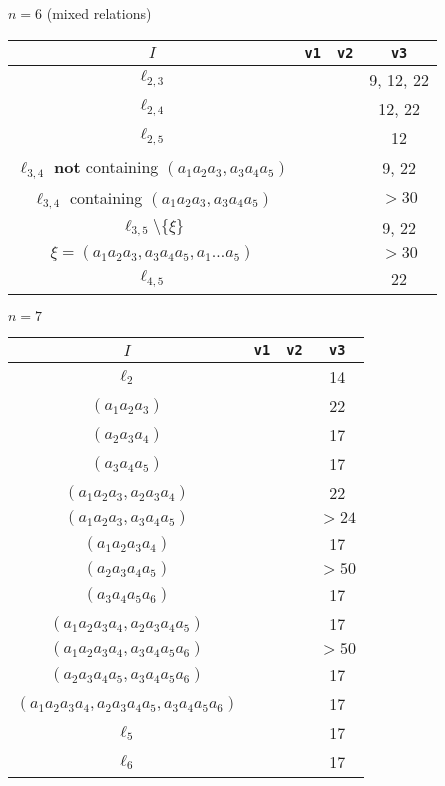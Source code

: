 \documentclass{article}
\begin{document}
\begin{flushleft}
\begin{center}
      \newpage

      $n=6$ (mixed relations)
      \begin{longtable}{|c|c|c|c|}
         \hline
         $I$ & \texttt{v1} & \texttt{v2} & \texttt{v3} \\
         \hline 
         $\ell_{2,3}$ &&& 9, 12, 22 \\
         $\ell_{2,4}$ &&& 12, 22 \\
         $\ell_{2,5}$ &&& 12 \\
         $\ell_{3,4}$ \textbf{not} containing $(a_1a_2a_3,a_3a_4a_5)$ &&& 9, 22 \\
         \hline
         \rowcolor{red!50!white}
         $\ell_{3,4}$ containing $(a_1a_2a_3,a_3a_4a_5)$ &&& $>30$ \\
         \hline
         $\ell_{3,5} \setminus \{\xi\}$ &&& 9, 22 \\
         \hline
         \rowcolor{red!50!white}
         $\xi = (a_1a_2a_3,a_3a_4a_5, a_1\ldots a_5)$ &&& $>30$ \\
         \hline
         $\ell_{4,5}$ &&& 22 \\
         \hline
      \end{longtable}

      $n=7$
      \begin{longtable}{|c|c|c|c|}
         \hline
         $I$ & \texttt{v1} & \texttt{v2} & \texttt{v3} \\
         \hline
         $\ell_2$ &&& 14 \\
         \hline
         $(a_1a_2a_3)$ &&& 22 \\
         $(a_2a_3a_4)$ &&& 17 \\
         $(a_3a_4a_5)$ &&& 17 \\
         $(a_1a_2a_3, a_2a_3a_4)$ &&& 22 \\
         \rowcolor{red!50!white}
         $(a_1a_2a_3,a_3a_4a_5)$ &&& $>24$ \\
         \hline
         $(a_1a_2a_3a_4)$ &&& 17 \\
         \rowcolor{red!50!white}
         $(a_2a_3a_4a_5)$ &&& $>50$ \\
         $(a_3a_4a_5a_6)$ &&& 17 \\
         $(a_1a_2a_3a_4, a_2a_3a_4a_5)$ &&& 17 \\
         \rowcolor{red!50!white}
         $(a_1a_2a_3a_4, a_3a_4a_5a_6)$ &&& $>50$ \\
         $(a_2a_3a_4a_5, a_3a_4a_5a_6)$ &&& 17 \\
         $(a_1a_2a_3a_4, a_2a_3a_4a_5, a_3a_4a_5a_6)$ &&& 17 \\
         \hline
         $\ell_5$ &&& 17 \\
         \hline
         $\ell_6$ &&& 17 \\
         \hline
      \end{longtable}


\end{center}
\end{flushleft}
\end{document}
